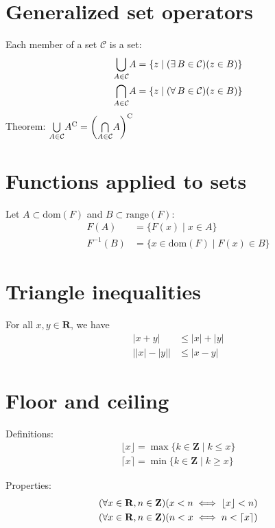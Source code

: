 \documentclass[letterpaper,landscape,9pt,fleqn]{extarticle}
\newcommand{\dom}{\mathrm{dom}}
\newcommand{\range}{\mathrm{range}}
\newcommand{\reals}{\mathbf{R}}
\newcommand{\integers}{\mathbf{Z}}
\DeclarePairedDelimiter{\parens}{\lparen}{\rparen}
\begin{document}
\begin{multicols*}{3}
 \section*{Generalized set operators}
 Each member of a set $\mathcal{C}$ is a set:
\begin{alignat*}{1}
    &\underset{A \in \mathcal{C}}{\bigcup} A = \left \{z \mid \parens*{\exists \, B  \in \mathcal{C} }\parens{z \in B} \right \}\\
    &\underset{A \in \mathcal{C}}{\bigcap} A = \left \{z \mid \parens*{\forall \, B \in \mathcal{C}}\parens{z \in B} \right \}
\end{alignat*}
Theorem: \(\underset{A \in \mathcal{C}}{\bigcup} A^\mathrm{C} = \parens*{\underset{A \in \mathcal{C}}{\bigcap} A}^\mathrm{C} \)
\section*{Functions applied to  sets}
Let $A \subset \dom(F)$ and $B \subset \range(F)$:
\begin{alignat*}{1}
    F(A) &= \{F(x) \mid x \in A \} \\
    F^{-1}(B) &= \{x \in \dom(F) \mid F(x) \in B \}
\end{alignat*}


\section*{Triangle inequalities}
For all $x,y \in \reals$, we have
\begin{alignat*}{1}
    |x+y| &\leq |x| + |y| \\
    \big | |x| - |y|  \big |  &\leq |x-y|    
\end{alignat*}
\section*{Floor and ceiling}
\vspace{-0.1in}
\noindent Definitions:
\begin{align*}
    \lfloor x \rfloor = \max \{k \in \integers \mid  k \leq x \} \\
    \lceil x \rceil = \min  \{k \in \integers \mid  k \geq x \}   
\end{align*}

\noindent Properties:
\begin{align*}
   & \parens*{\forall x \in \reals, n \in \integers} \parens*{x < n \iff  \lfloor x \rfloor < n}\\
   & \parens*{\forall x \in \reals, n \in \integers} \parens*{n < x \iff  n < \lceil  x \rceil}\\
\end{align*}
\vspace{-0.51in} 



\end{multicols*}
\end{document}
